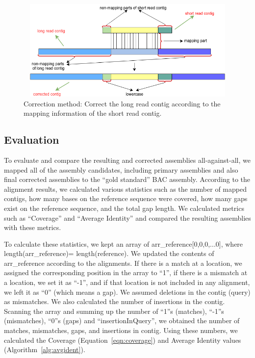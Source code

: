 \documentclass{llncs}
\begin{document}
\begin{figure}[h!tbp]
\centerline{\includegraphics[width=12cm, height=5cm]{BACAlgorithm.png}}
\caption{Correction method: Correct the long read contig according to the mapping information of the short read contig.}
\label{fig:correction}
\end{figure}

\subsection{Evaluation}
\label{eval}

To evaluate and compare the resulting and corrected assemblies all-against-all, we mapped all of the assembly candidates, including primary assemblies and also final corrected assemblies to the ``gold standard'' BAC assembly. According to the alignment results, we calculated various statistics such as the number of mapped contigs, how many bases on the reference sequence were covered, how many gaps exist on the reference sequence, and the total gap length. We calculated metrics such as ``Coverage'' and ``Average Identity'' and compared the resulting assemblies with these metrics. 

To calculate these statistics, we kept an array of arr{\_}reference[0,0,0,...0], where 
\\length(arr{\_}reference)= length(reference). 
We updated the contents of arr{\_}reference according to the alignments. 
If there is a match at a location, we assigned the corresponding position in the array to ``1'', if there is a mismatch at a location, 
we set it as ``-1'', and if that location is not included in any alignment, we left it as ``0'' 
(which means a gap). We assumed deletions in the contig (query) as mismatches. 
We also calculated the number of insertions in the contig. 
Scanning the array and summing up the number of ``1''s (matches), ``-1''s (mismatches), ``0''s (gaps) and ``insertionInQuery'', we obtained the number of matches, mismatches, gaps, and insertions in contig. 
Using these numbers, we calculated the Coverage (Equation~\ref{eqn:coverage}) and Average Identity values (Algorithm~\ref{alg:avgident}).
\end{document}
